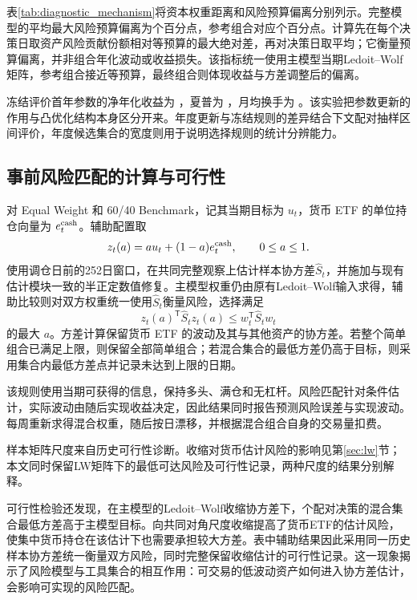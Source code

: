 表\ref{tab:diagnostic_mechanism}将资本权重距离和风险预算偏离分别列示。完整模型的平均最大风险预算偏离为\diagPrimaryRCError{}个百分点，参考组合对应\diagReferenceRCError{}个百分点。计算先在每个决策日取资产风险贡献份额相对等预算的最大绝对差，再对决策日取平均；它衡量预算偏离，并非组合年化波动或收益损失。该指标统一使用主模型当期Ledoit--Wolf矩阵，参考组合接近等预算，最终组合则体现收益与方差调整后的偏离。


冻结评价首年参数的净年化收益为 \diagFrozenReturn，夏普为 \diagFrozenSharpe，月均换手为 \diagFrozenTurnover。该实验把参数更新的作用与凸优化结构本身区分开来。年度更新与冻结规则的差异结合下文配对抽样区间评价，年度候选集合的宽度则用于说明选择规则的统计分辨能力。
\FloatBarrier


\subsection{事前风险匹配的计算与可行性}
对 Equal Weight 和 60/40 Benchmark，记其当期目标为 $u_t$，货币 ETF 的单位持仓向量为 $e_t^{\rm cash}$。辅助配置取
\[
z_t(a)=a u_t+(1-a)e_t^{\rm cash},\qquad 0\leq a\leq1.
\]
使用调仓日前的252日窗口，在共同完整观察上估计样本协方差$\widehat S_t$，并施加与现有估计模块一致的半正定数值修复。主模型权重仍由原有Ledoit--Wolf输入求得，辅助比较则对双方权重统一使用$\widehat S_t$衡量风险，选择满足
\[
z_t(a)^\mathsf T\widehat S_t z_t(a)
\leq w_t^\mathsf T\widehat S_t w_t
\]
的最大 $a$。方差计算保留货币 ETF 的波动及其与其他资产的协方差。若整个简单组合已满足上限，则保留全部简单组合；若混合集合的最低方差仍高于目标，则采用集合内最低方差点并记录未达到上限的日期。

该规则使用当期可获得的信息，保持多头、满仓和无杠杆。风险匹配针对条件估计，实际波动由随后实现收益决定，因此结果同时报告预测风险误差与实现波动。每周重新求得混合权重，随后按日漂移，并根据混合组合自身的交易量扣费。

样本矩阵尺度来自历史可行性诊断。收缩对货币估计风险的影响见第\ref{sec:lw}节；本文同时保留LW矩阵下的最低可达风险及可行性记录，两种尺度的结果分别解释。

可行性检验还发现，在主模型的Ledoit--Wolf收缩协方差下，\diagLWMatchInfeasible{}个配对决策的混合集合最低方差高于主模型目标。向共同对角尺度收缩提高了货币ETF的估计风险，使集中货币持仓在该估计下也需要承担较大方差。表中辅助结果因此采用同一历史样本协方差统一衡量双方风险，同时完整保留收缩估计的可行性记录。这一现象揭示了风险模型与工具集合的相互作用：可交易的低波动资产如何进入协方差估计，会影响可实现的风险匹配。


